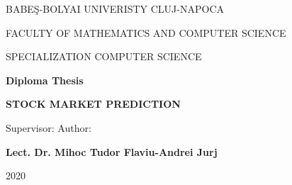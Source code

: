 \begin{titlepage}
	\begin{center}
		\Large{{BABEŞ-BOLYAI UNIVERISTY CLUJ-NAPOCA}} 
		
		\Large{{FACULTY OF MATHEMATICS AND COMPUTER SCIENCE}} 
		
		\Large{{SPECIALIZATION COMPUTER SCIENCE}}
		
		\vspace{6cm}
		
		\textbf{Diploma Thesis}
		
		\vspace{1cm}
		\Huge\textbf{{STOCK MARKET PREDICTION}}
		
	\end{center}
	\vspace{6cm}
	
	\hspace*{0.8cm}Supervisor: \hfill  Author: \hspace*{0.8cm} 
	
	\textbf{Lect. Dr. Mihoc Tudor  \hfill  \textbf{Flaviu-Andrei Jurj}}
	
	\vfill
	\begin{center}
		\Large{2020}
	\end{center}
\end{titlepage}  